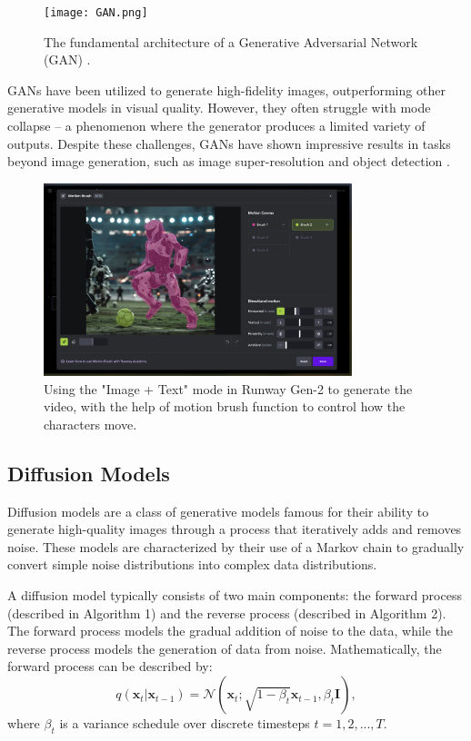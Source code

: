 \documentclass[11pt,a4paper,oneside]{report}
\begin{document}
\begin{figure}[htbp]
  \centering
  \texttt{[image: GAN.png]}
  \caption{The fundamental architecture of a Generative Adversarial Network (GAN) \cite{SemiEngineering2023GAN}.}
\end{figure}

GANs have been utilized to generate high-fidelity images, outperforming other generative models in visual quality. However, they often struggle with mode collapse -- a phenomenon where the generator produces a limited variety of outputs. Despite these challenges, GANs have shown impressive results in tasks beyond image generation, such as image super-resolution \cite{denton2015deep}and object detection \cite{goodfellow2014generative}.

\begin{figure}[htbp]
  \centering
  \includegraphics[width=0.8\textwidth]{Runway.png}
  \caption{Using the "Image + Text" mode in Runway Gen-2 to generate the video, with the help of motion brush function to control how the characters move.}
\end{figure}

\subsection{Diffusion Models}

Diffusion models \cite{sohl2015deep, ho2020denoising} are a class of generative models famous for their ability to generate high-quality images through a process that iteratively adds and removes noise. These models are characterized by their use of a Markov chain to gradually convert simple noise distributions into complex data distributions.

A diffusion model typically consists of two main components: the forward process (described in Algorithm 1) and the reverse process (described in Algorithm 2). The forward process models the gradual addition of noise to the data, while the reverse process models the generation of data from noise. Mathematically, the forward process can be described by:
\begin{equation}
q(\mathbf{x}_t | \mathbf{x}_{t-1}) = \mathcal{N}(\mathbf{x}_t; \sqrt{1-\beta_t} \mathbf{x}_{t-1}, \beta_t \mathbf{I}),
\end{equation}
where $\beta_t$ is a variance schedule over discrete timesteps $t = 1, 2, ..., T$. 
\end{document}
